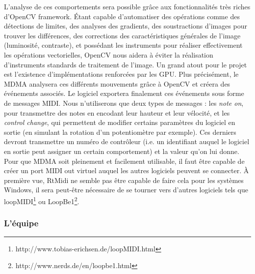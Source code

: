 \par L'analyse de ces comportements sera possible grâce aux fonctionnalités très riches d'OpenCV framework. Étant capable d'automatiser des opérations comme des détections de limites, des analyses des gradients, des soustractions d'images pour trouver les différences, des corrections des caractéristiques générales de l'image (luminosité, contraste), et possédant les instruments pour réaliser effectivement les opérations vectorielles, OpenCV nous aidera à éviter la réalisation d'instruments standards de traitement de l'image. Un grand atout pour le projet est l'existence d'implémentations renforcées par les GPU.
Plus précisément, le MDMA analysera ces différents mouvements grâce à OpenCV et créera des événements associés.
Le logiciel exportera finalement ces événements sous forme de messages MIDI. Nous n'utiliserons que deux types de messages : les \emph{note on}, pour transmettre des notes en encodant leur hauteur et leur vélocité, et les \emph{control change}, qui permettent de modifier certains paramètres du logiciel en sortie (en simulant la rotation d'un potentiomètre par exemple). Ces derniers devront transmettre un numéro de contrôleur (i.e. un identifiant auquel le logiciel en sortie peut assigner un certain comportement) et la valeur qu'on lui donne. Pour que MDMA soit pleinement et facilement utilisable, il faut être capable de créer un port MIDI out virtuel auquel les autres logiciels peuvent se connecter. À première vue, RtMidi ne semble pas être capable de faire cela pour les systèmes Windows, il sera peut-être nécessaire de se tourner vers d'autres logiciels tels que loopMIDI\footnote{http://www.tobias-erichsen.de/loopMIDI.html} ou LoopBe1\footnote{http://www.nerds.de/en/loopbe1.html}.

\subsubsection*{L'équipe}

